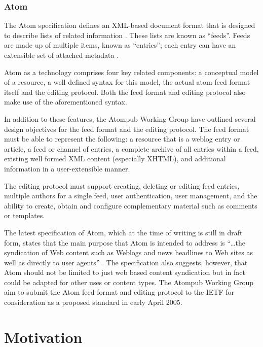 \documentclass{CRPITStyle}
\begin{document}
\subsubsection{Atom}
\label{sec-atom-detail}

The Atom specification defines an XML-based document format that is
designed to describe lists of related information
\cite{Nott-M-2005-Atom}. These lists are known as ``feeds''. Feeds are
made up of multiple items, known as ``entries''; each entry can have an
extensible set of attached metadata \cite{Nott-M-2005-Atom}.

Atom as a technology comprises four key related components: a conceptual
model of a resource, a well defined syntax for this model, the actual
atom feed format itself and the editing protocol. Both the feed format
and editing protocol also make use of the aforementioned syntax.

In addition to these features, the Atompub Working Group have outlined
several design objectives for the feed format and the editing protocol.
The feed format must be able to represent the following: a resource that
is a weblog entry or article, a feed or channel of entries, a complete
archive of all entries within a feed, existing well formed XML
content (especially XHTML), and additional information in a
user-extensible manner.

The editing protocol must support creating, deleting or editing feed
entries, multiple authors for a single feed, user authentication, user
management, and the ability to create, obtain and configure
complementary material such as comments or templates.

The latest specification of Atom, which at the time of writing is still
in draft form, states that the main purpose that Atom is intended to
address is ``\ldots{}the syndication of Web content such as Weblogs and
news headlines to Web sites as well as directly to user agents''
\cite{Nott-M-2005-Atom}. The specification also suggests, however, that
Atom should not be limited to just web based content syndication but in
fact could be adapted for other uses or content types. The Atompub
Working Group aim to submit the Atom feed format and editing protocol to
the IETF for consideration as a proposed standard in early April 2005.


\section{Motivation}
\label{sec-motivation}
\end{document}
